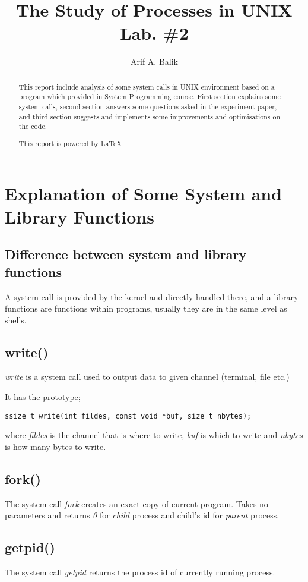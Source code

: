 \documentclass[11pt]{article}
\title{The Study of Processes in UNIX \\Lab. \#2}
\author{Arif A. Balik}
\affil{Undergraduate Student\\
	Sytstems Programming\\
	Department of Computer Science\\
	Arel University\\
	Büyükçekmece, İstanbul 34537\\
    Email: arifbalik@outlook.com
}
\begin{document}
\maketitle

\begin{abstract}
This report include analysis of some system calls in UNIX environment based on a program which provided in System Programming course. First section explains some system calls, second section answers some questions asked in the experiment paper, and third section suggests and implements some improvements and optimisations on the code.

This report is powered by \LaTeX{}
\end{abstract}
\section*{Explanation of Some System and Library Functions}
\subsection*{Difference between system and library functions}
A system call is provided by the kernel and directly handled there, and a library functions are functions within programs, usually they are in the same level as shells.

\subsection*{write()}
\textit{write} is a system call used to output data to given channel (terminal, file etc.)

It has the prototype;

\begin{lstlisting}[frame=tlrb]
ssize_t write(int fildes, const void *buf, size_t nbytes);
\end{lstlisting}

where \textit{fildes} is the channel that is where to write, \textit{buf} is which to write and \textit{nbytes} is how many bytes to write.

\subsection*{fork()}
The system call \textit{fork} creates an exact copy of current program. Takes no parameters and returns \textit{0} for \textit{child} process and child's id for \textit{parent} process.

\subsection*{getpid()}
The system call \textit{getpid} returns the process id of currently running process.
\end{document}
